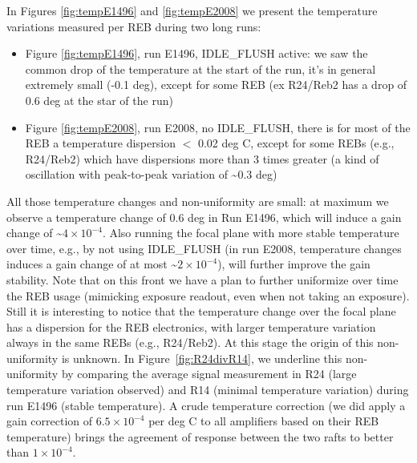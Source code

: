 In Figures \ref{fig:tempE1496} and \ref{fig:tempE2008} we present the temperature variations measured per REB during two long runs:

\begin{itemize}
\item Figure \ref{fig:tempE1496}, run E1496, IDLE\_FLUSH active: we saw the common drop of the temperature at the start of the run, it’s in general extremely small (-0.1 deg), except for some REB (ex R24/Reb2 has a drop of 0.6 deg at the star of the run)
\item Figure \ref{fig:tempE2008}, run E2008, no IDLE\_FLUSH, there is for most of the REB a temperature dispersion $<$ 0.02 deg C, except for some REBs (e.g., R24/Reb2) which have dispersions more than 3 times greater (a kind of oscillation with peak-to-peak variation of \textasciitilde 0.3 deg)
\end{itemize}

All those temperature changes and non-uniformity are small: at maximum we observe a temperature change of 0.6 deg in Run E1496, which will induce a gain change of \textasciitilde $4\times 10^{-4}$. Also running the focal plane with more stable temperature over time, e.g., by not using IDLE\_FLUSH (in run E2008, temperature changes induces a gain change of at most \textasciitilde$2\times 10^{-4}$), will further improve the gain stability. Note that on this front we have a plan to further uniformize over time the REB usage (mimicking exposure readout, even when not taking an exposure). Still it is interesting to notice that the temperature change over the focal plane has a dispersion for the REB electronics, with larger temperature variation always in the same REBs (e.g., R24/Reb2). At this stage the origin of this  non-uniformity is unknown.
In Figure~\ref{fig:R24divR14}, we underline this non-uniformity by comparing the average signal measurement in R24 (large temperature variation observed) and R14 (minimal temperature variation) during run E1496 (stable temperature). A crude temperature correction (we did apply a gain correction of $6.5\times10^{-4}$ per deg C to all amplifiers based on their REB temperature)  brings the agreement of response  between the two rafts to better than $1\times10^{-4}$.


\clearpage

